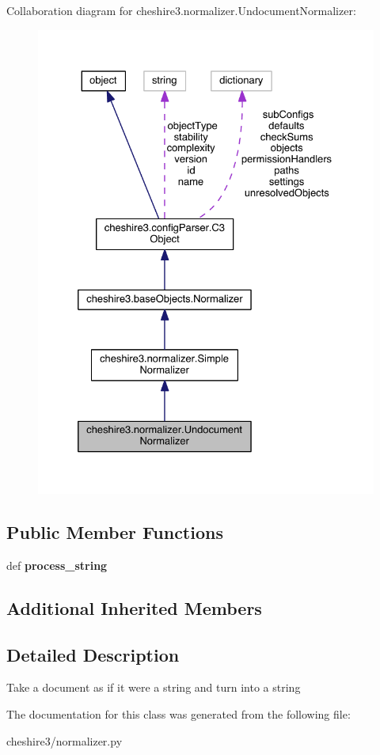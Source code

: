 Collaboration diagram for cheshire3.\-normalizer.\-Undocument\-Normalizer\-:
\nopagebreak
\begin{figure}[H]
\begin{center}
\leavevmode
\includegraphics[width=328pt]{classcheshire3_1_1normalizer_1_1_undocument_normalizer__coll__graph}
\end{center}
\end{figure}
\subsection*{Public Member Functions}
\begin{DoxyCompactItemize}
\item 
\hypertarget{classcheshire3_1_1normalizer_1_1_undocument_normalizer_a51e45a9973607a5d47879de4a1f52db7}{def {\bfseries process\-\_\-string}}\label{classcheshire3_1_1normalizer_1_1_undocument_normalizer_a51e45a9973607a5d47879de4a1f52db7}

\end{DoxyCompactItemize}
\subsection*{Additional Inherited Members}


\subsection{Detailed Description}
\begin{DoxyVerb}Take a document as if it were a string and turn into a string \end{DoxyVerb}
 

The documentation for this class was generated from the following file\-:\begin{DoxyCompactItemize}
\item 
cheshire3/normalizer.\-py\end{DoxyCompactItemize}
